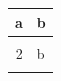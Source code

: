 \documentclass{article}
\begin{document}
\thispagestyle{empty}

\begin{table}
\centering
\begin{tabular}{rl}
\toprule
\textbf{a} & \textbf{b}\\
\midrule
\cellcolor{red!5}{1} & \cellcolor{red!5}{a}\\
2 & b\\
\cellcolor{red!5}{3} & \cellcolor{red!5}{c}\\
\bottomrule
\end{tabular}
\end{table}
\end{document}

